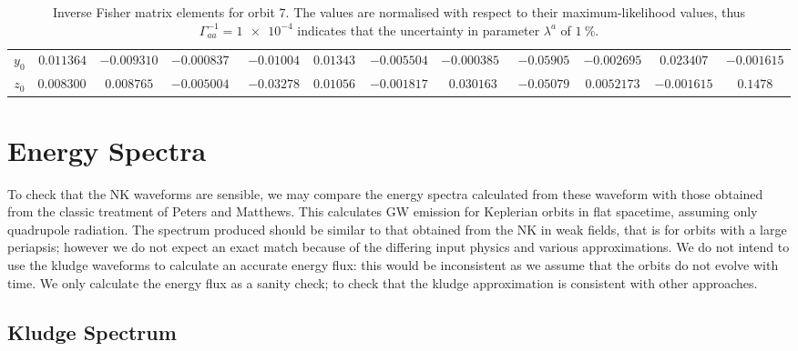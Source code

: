 \begin{table}
\begin{tabular}{cccccccccccc}
$y_0$ & $\num{0.011364}$ & $\num{-0.0093101}$ & $\num{-0.00083746}$ & $\num{-0.010049}$ & $\num{0.013431}$ & $\num{-0.0055042}$ & $\num{-0.00038537}$ & $\num{-0.059053}$ & $\num{-0.0026959}$ & $\num{0.023407}$ & $\num{-0.0016153}$\\
$z_0$ & $\num{0.0083009}$ & $\num{0.008765}$ & $\num{-0.0050044}$ & $\num{-0.032782}$ & $\num{0.010567}$ & $\num{-0.0018176}$ & $\num{0.030163}$ & $\num{-0.050792}$ & $\num{0.0052173}$ & $\num{-0.0016153}$ & $\num{0.1478}$
\end{tabular}
\caption{Inverse Fisher matrix elements for orbit 7. The values are normalised with respect to their maximum-likelihood values, thus $\Gamma^{-1}_{aa} = \num{1e-4}$ indicates that the uncertainty in parameter $\lambda^a$ of $\SI{1}{\percent}$.}
\label{tab:Fisher_7}
\end{table}

\section{Energy Spectra}

To check that the NK waveforms are sensible, we may compare the energy spectra calculated from these waveform with those obtained from the classic treatment of Peters and Matthews\cite{Peters1963, Peters1964}. This calculates GW emission for Keplerian orbits in flat spacetime, assuming only quadrupole radiation. The spectrum produced should be similar to that obtained from the NK in weak fields, that is for orbits with a large periapsis; however we do not expect an exact match because of the differing input physics and various approximations.  We do not intend to use the kludge waveforms to calculate an accurate energy flux: this would be inconsistent as we assume that the orbits do not evolve with time. We only calculate the energy flux as a sanity check; to check that the kludge approximation is consistent with other approaches.

\subsection{Kludge Spectrum}

